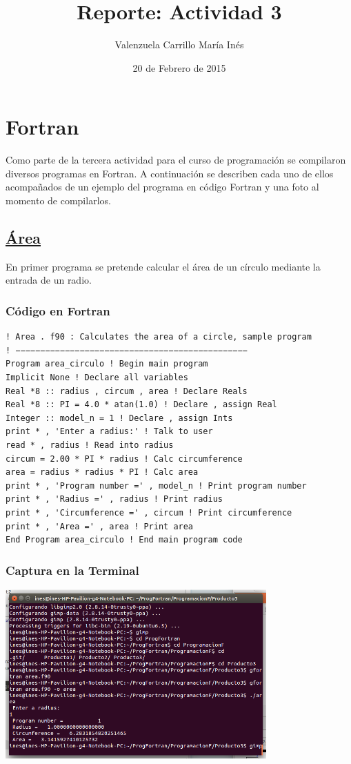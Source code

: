 \documentclass[a4paper]{article}
\title{Reporte: Actividad 3}
\author{Valenzuela Carrillo María Inés}
\date{20 de Febrero de 2015}
\begin{document}
\maketitle

\section{Fortran}
Como parte de la tercera actividad para el curso de programación se compilaron diversos programas en Fortran. A continuación se describen cada uno de ellos acompañados de un ejemplo del programa en código Fortran y una foto al momento de compilarlos.
\subsection{\underline{ Área }}
En primer programa se pretende calcular el área de un círculo mediante la entrada de un radio.
\subsubsection{Código en Fortran}
\begin{verbatim}
! Area . f90 : Calculates the area of a circle, sample program
! −−−−−−−−−−−−−−−−−−−−−−−−−−−−−−−−−−−−−−−−−−−−−−−
Program area_circulo ! Begin main program
Implicit None ! Declare all variables
Real *8 :: radius , circum , area ! Declare Reals
Real *8 :: PI = 4.0 * atan(1.0) ! Declare , assign Real
Integer :: model_n = 1 ! Declare , assign Ints
print * , 'Enter a radius:' ! Talk to user
read * , radius ! Read into radius
circum = 2.00 * PI * radius ! Calc circumference
area = radius * radius * PI ! Calc area
print * , 'Program number =' , model_n ! Print program number
print * , 'Radius =' , radius ! Print radius
print * , 'Circumference =' , circum ! Print circumference
print * , 'Area =' , area ! Print area
End Program area_circulo ! End main program code
\end{verbatim}

\subsubsection{Captura en la Terminal}
  \begin{center}
\includegraphics[width=10cm]{area.png}
\end{center}
\end{document}
